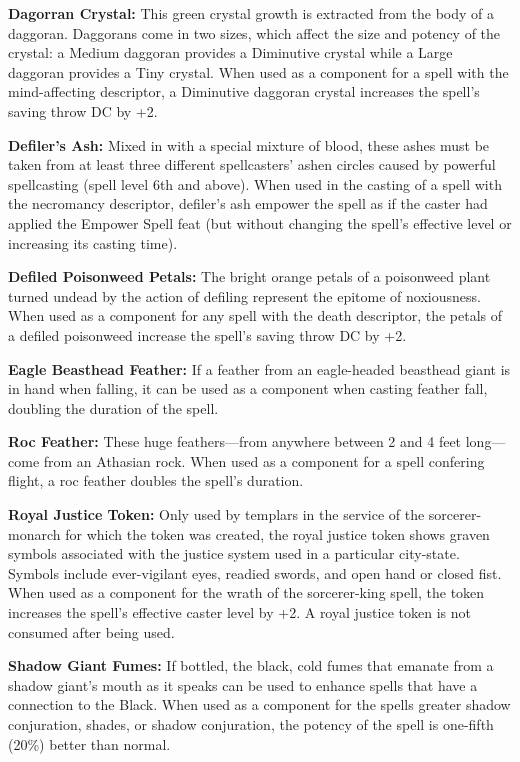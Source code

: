 \textbf{Dagorran Crystal:} This green crystal growth is extracted from the body of a daggoran. Daggorans come in two sizes, which affect the size and potency of the crystal: a Medium daggoran provides a Diminutive crystal while a Large daggoran provides a Tiny crystal. When used as a component for a spell with the mind-affecting descriptor, a Diminutive daggoran crystal increases the spell's saving throw DC by +2.

\textbf{Defiler's Ash:} Mixed in with a special mixture of blood, these ashes must be taken from at least three different spellcasters' ashen circles caused by powerful spellcasting (spell level 6th and above). When used in the casting of a spell with the necromancy descriptor, defiler's ash empower the spell as if the caster had applied the Empower Spell feat (but without changing the spell's effective level or increasing its casting time).

\textbf{Defiled Poisonweed Petals:} The bright orange petals of a poisonweed plant turned undead by the action of defiling represent the epitome of noxiousness. When used as a component for any spell with the death descriptor, the petals of a defiled poisonweed increase the spell's saving throw DC by +2.

\textbf{Eagle Beasthead Feather:} If a feather from an eagle-headed beasthead giant is in hand when falling, it can be used as a component when casting feather fall, doubling the duration of the spell.

\textbf{Roc Feather:} These huge feathers---from anywhere between 2 and 4 feet long---come from an Athasian rock. When used as a component for a spell confering flight, a roc feather doubles the spell's duration.

\textbf{Royal Justice Token:} Only used by templars in the service of the sorcerer-monarch for which the token was created, the royal justice token shows graven symbols associated with the justice system used in a particular city-state. Symbols include ever-vigilant eyes, readied swords, and open hand or closed fist. When used as a component for the wrath of the sorcerer-king spell, the token increases the spell's effective caster level by +2. A royal justice token is not consumed after being used.

\textbf{Shadow Giant Fumes:} If bottled, the black, cold fumes that emanate from a shadow giant's mouth as it speaks can be used to enhance spells that have a connection to the Black. When used as a component for the spells greater shadow conjuration, shades, or shadow conjuration, the potency of the spell is one-fifth (20\%) better than normal.

